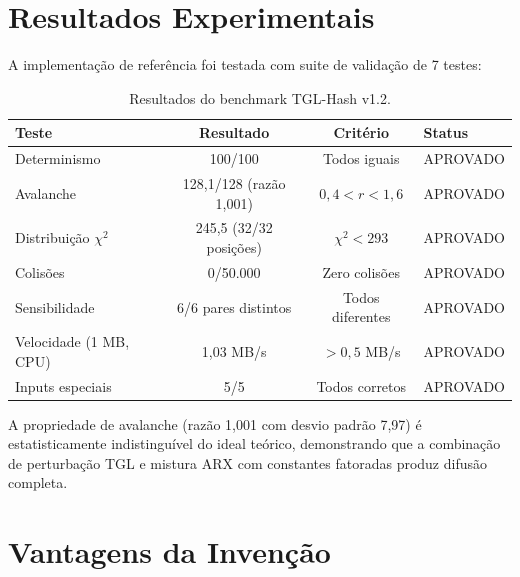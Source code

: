 \documentclass[12pt,a4paper]{article}
\begin{document}
\section{Resultados Experimentais}

A implementação de referência foi testada com suite de validação de 7 testes:

\begin{table}[H]
\centering
\caption{Resultados do benchmark TGL-Hash v1.2.}
\label{tab:resultados}
\begin{tabular}{lccl}
\toprule
\textbf{Teste} & \textbf{Resultado} & \textbf{Critério} & \textbf{Status} \\
\midrule
Determinismo & 100/100 & Todos iguais & APROVADO \\
Avalanche & 128,1/128 (razão 1,001) & $0{,}4 < r < 1{,}6$ & APROVADO \\
Distribuição $\chi^2$ & 245,5 (32/32 posições) & $\chi^2 < 293$ & APROVADO \\
Colisões & 0/50.000 & Zero colisões & APROVADO \\
Sensibilidade & 6/6 pares distintos & Todos diferentes & APROVADO \\
Velocidade (1 MB, CPU) & 1,03 MB/s & $> 0{,}5$ MB/s & APROVADO \\
Inputs especiais & 5/5 & Todos corretos & APROVADO \\
\bottomrule
\end{tabular}
\end{table}

A propriedade de avalanche (razão 1,001 com desvio padrão 7,97) é estatisticamente indistinguível do ideal teórico, demonstrando que a combinação de perturbação TGL e mistura ARX com constantes fatoradas produz difusão completa.

\section{Vantagens da Invenção}
\end{document}
